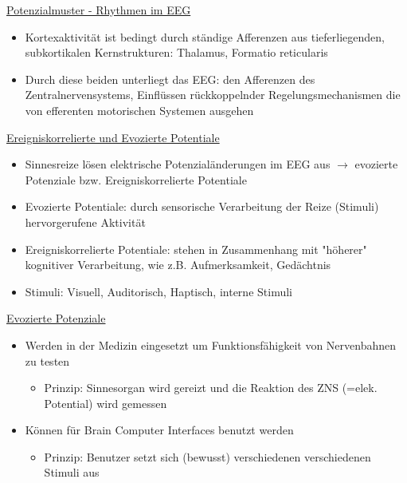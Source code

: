\documentclass[a4paper,10pt,oneside]{article}
\begin{document}
\underline{Potenzialmuster - Rhythmen im EEG} \\
	\begin{itemize}
		\item Kortexaktivität ist bedingt durch ständige Afferenzen aus tieferliegenden, subkortikalen Kernstrukturen: Thalamus, Formatio reticularis 
		\item Durch diese beiden unterliegt das EEG: den Afferenzen des Zentralnervensystems, Einflüssen rückkoppelnder Regelungsmechanismen die von efferenten motorischen Systemen ausgehen
	\end{itemize}
	
\underline{Ereigniskorrelierte und Evozierte Potentiale} \\
 	\begin{itemize}
 		\item Sinnesreize lösen elektrische Potenzialänderungen im EEG aus $\rightarrow$ evozierte Potenziale bzw. Ereigniskorrelierte Potentiale 
 		\item Evozierte Potentiale: durch sensorische Verarbeitung der Reize (Stimuli) hervorgerufene Aktivität
 		\item Ereigniskorrelierte Potentiale: stehen in Zusammenhang mit "höherer" kognitiver Verarbeitung, wie z.B. Aufmerksamkeit, Gedächtnis
 		\item Stimuli: Visuell, Auditorisch, Haptisch, interne Stimuli
 	\end{itemize}

\underline{Evozierte Potenziale} \\
	\begin{itemize}
		\item Werden in der Medizin eingesetzt um Funktionsfähigkeit von Nervenbahnen zu testen
			\begin{itemize}
				\item Prinzip: Sinnesorgan wird gereizt und die Reaktion des ZNS (=elek. Potential) wird gemessen
			\end{itemize}
		\item Können für Brain Computer Interfaces benutzt werden
			\begin{itemize}
				\item Prinzip: Benutzer setzt sich (bewusst) verschiedenen verschiedenen Stimuli aus
			\end{itemize}
	\end{itemize}
	
\end{document}
